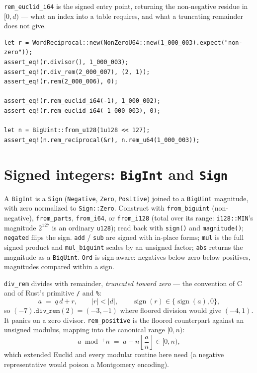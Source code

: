 \documentclass[11pt]{article}
\newcommand{\code}[1]{\texttt{#1}}
\begin{document}
\code{rem\_euclid\_i64} is the signed entry point, returning the
non-negative residue in $[0, d)$ --- what an index into a table requires,
and what a truncating remainder does not give.

\begin{lstlisting}
let r = WordReciprocal::new(NonZeroU64::new(1_000_003).expect("non-zero"));
assert_eq!(r.divisor(), 1_000_003);
assert_eq!(r.div_rem(2_000_007), (2, 1));
assert_eq!(r.rem(2_000_006), 0);

assert_eq!(r.rem_euclid_i64(-1), 1_000_002);
assert_eq!(r.rem_euclid_i64(-1_000_003), 0);

let n = BigUint::from_u128(1u128 << 127);
assert_eq!(n.rem_reciprocal(&r), n.rem_u64(1_000_003));
\end{lstlisting}

\section{Signed integers: \code{BigInt} and \code{Sign}}

A \code{BigInt} is a \code{Sign} (\code{Negative}, \code{Zero},
\code{Positive}) joined to a \code{BigUint} magnitude, with zero normalized
to \code{Sign::Zero}. Construct with \code{from\_biguint} (non-negative),
\code{from\_parts}, \code{from\_i64}, or \code{from\_i128} (total over its
range: \code{i128::MIN}'s magnitude $2^{127}$ is an ordinary
\code{u128}); read back with \code{sign()} and
\code{magnitude()}; \code{negated} flips the sign. \code{add} /
\code{sub} are signed with in-place forms; \code{mul} is the full
signed product and \code{mul\_biguint} scales by an unsigned factor;
\code{abs} returns the magnitude as a \code{BigUint}. \code{Ord} is
sign-aware: negatives below zero below positives, magnitudes compared
within a sign.

\code{div\_rem} divides with remainder, \emph{truncated toward zero} ---
the convention of C and of Rust's primitive \code{/} and \code{\%}:
\begin{equation}
a \;=\; q\,d + r,
\qquad |r| < |d|,
\qquad \operatorname{sign}(r) \in \{\operatorname{sign}(a), 0\},
\end{equation}
so $(-7).\code{div\_rem}(2) = (-3, -1)$ where floored division would give
$(-4, 1)$. It panics on a zero divisor. \code{rem\_positive} is the
floored counterpart against an unsigned modulus, mapping into the
canonical range $[0, n)$:
\begin{equation}
a \bmod^{+} n \;=\; a - n \left\lfloor \frac{a}{n} \right\rfloor \in [0, n),
\end{equation}
which extended Euclid and every modular routine here need (a negative
representative would poison a Montgomery encoding).
\end{document}
